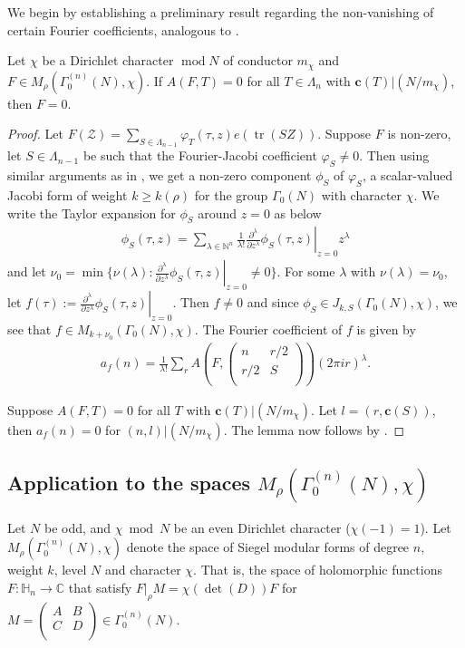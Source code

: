 \documentclass[11pt]{amsart}
\numberwithin{equation}{section}
\newcommand{\mbb}{\mathbb}
\newcommand{\mc}{\mathcal}
\newcommand{\mf}{\mathbf}
\newcommand{\smat}[4]{\left( \begin{smallmatrix} #1 & #2 \\ #3 & #4 \\ \end{smallmatrix} \right)}
\DeclareMathOperator{\tr}{tr}
\renewcommand*{\mod}{\operatorname{mod}}
\newcommand{\sumn}{\sum \nolimits}
\begin{document}
We begin by establishing a preliminary result regarding the non-vanishing of certain Fourier coefficients, analogous to \cite{yamana2009determination}.
\begin{lemma}\label{lem:yamana}
   Let $\chi$ be a Dirichlet character $\mod N$ of conductor $m_\chi$ and $F \in M_\rho(\Gamma_0^{(n)}(N), \chi)$. If $A(F, T)=0$ for all $T\in\Lambda_n$ with $\mf c(T)|(N/m_\chi)$, then $F=0$.
\end{lemma}
\begin{proof}
Let $F(\mc Z)= \sum_{S\in \Lambda_{n-1}}\varphi_T(\tau, z) e(\tr(SZ))$. Suppose $F$ is non-zero, let $S\in \Lambda_{n-1}$ be such that the Fourier-Jacobi coefficient $\varphi_S \neq 0$. Then using similar arguments as in \cite{boche-das}, we get a non-zero component $\phi_S$ of $\varphi_S$, a scalar-valued Jacobi form of weight $k\ge k(\rho)$ for the group $\Gamma_0(N)$ with character $\chi$. We write the Taylor expansion for $\phi_S$ around $z=0$ as below
\begin{align}
    \phi_S(\tau, z)= \sumn_{\lambda\in \mbb N^{n}}\frac{1}{\lambda!}\left.\frac{\partial^\lambda}{\partial z^\lambda}\phi_S(\tau, z)\right |_{z=0} z^\lambda
\end{align} 
and let
$\nu_0=\min \{\nu(\lambda): \left.\frac{\partial^\lambda}{\partial z^\lambda}\phi_S(\tau, z)\right |_{z=0}\neq 0\}$. For some $\lambda$ with $\nu(\lambda)=\nu_0$, let $f(\tau):= \left.\frac{\partial^\lambda}{\partial z^\lambda}\phi_S(\tau, z)\right |_{z=0}$. Then $f\neq 0$ and since $\phi_S\in J_{k,S}(\Gamma_0(N), \chi)$, we see that $f\in M_{k+\nu_0}(\Gamma_0(N), \chi)$. The Fourier coefficient of $f$ is given by \begin{align}
    a_f(n)= \frac{1}{\lambda!}\sumn_{r}A\left(F, \smat{n}{r/2}{r/2}{S}\right) (2\pi i r)^\lambda.
\end{align}

Suppose $A(F, T)=0$ for all $T$ with $\mf c(T)|(N/m_\chi)$. Let $l=(r, \mf c(S))$, then $a_f(n)=0$ for $(n, l)|(N/m_\chi)$. The lemma now follows by \cite[Lemma 3]{yamana2009determination}.
\end{proof}

\subsection{Application to the spaces \texorpdfstring{$M_{\rho}(\Gamma_{0}^{(n)}(N), \chi)$}{MrhoCHi}}
Let $N$ be odd, and  $\chi \bmod N$ be an even Dirichlet character ($\chi(-1)=1$). Let $M_\rho(\Gamma_0^{(n)}(N), \chi)$ denote the space of Siegel modular forms of degree $n$, weight $k$, level $N$ and character $\chi$. That is, the space of holomorphic functions $F:\mbb H_n\longrightarrow \mbb C$ that satisfy $F|_\rho M =\chi(\det(D))F$ for $M=\smat{A}{B}{C}{D}\in \Gamma_0^{(n)}(N)$.
\end{document}
